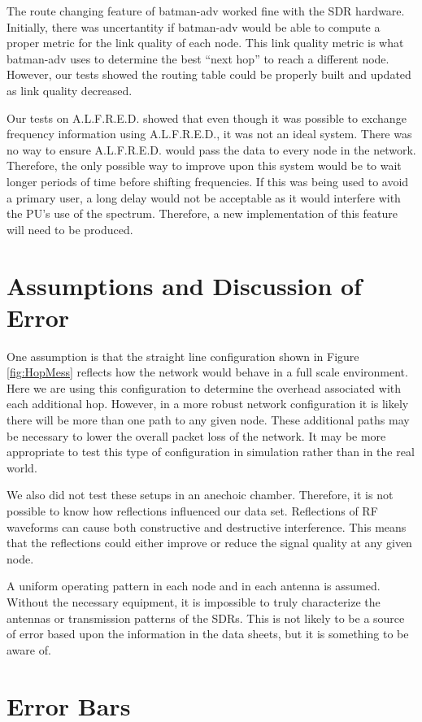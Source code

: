 The route changing feature of batman-adv worked fine with the SDR hardware. Initially, there was uncertantity if batman-adv would be able to compute a proper metric for the link quality of each node. This link quality metric is what batman-adv uses to determine the best ``next hop'' to reach a different node. However, our tests showed the routing table could be properly built and updated as link quality decreased.

Our tests on A.L.F.R.E.D. showed that even though it was possible to exchange frequency information using A.L.F.R.E.D., it was not an ideal system. There was no way to ensure A.L.F.R.E.D. would pass the data to every node in the network. Therefore, the only possible way to improve upon this system would be to wait longer periods of time before shifting frequencies. If this was being used to avoid a primary user, a long delay would not be acceptable as it would interfere with the PU's use of the spectrum. Therefore, a new implementation of this feature will need to be produced. 




\section{Assumptions and Discussion of Error}

One assumption is that the straight line configuration shown in Figure \ref{fig:HopMess} reflects how the network would behave in a full scale environment. Here we are using this configuration to determine the overhead associated with each additional hop. However, in a more robust network configuration it is likely there will be more than one path to any given node. These additional paths may be necessary to lower the overall packet loss of the network. It may be more appropriate to test this type of configuration in simulation rather than in the real world. 

We also did not test these setups in an anechoic chamber. Therefore, it is not possible to know how reflections influenced our data set. Reflections of RF waveforms can cause both constructive and destructive interference. This means that the reflections could either improve or reduce the signal quality at any given node.  

A uniform operating pattern in each node and in each antenna is assumed. Without the necessary equipment, it is impossible to truly characterize the antennas or transmission patterns of the SDRs. This is not likely to be a source of error based upon the information in the data sheets, but it is something to be aware of. 


\section{Error Bars}

